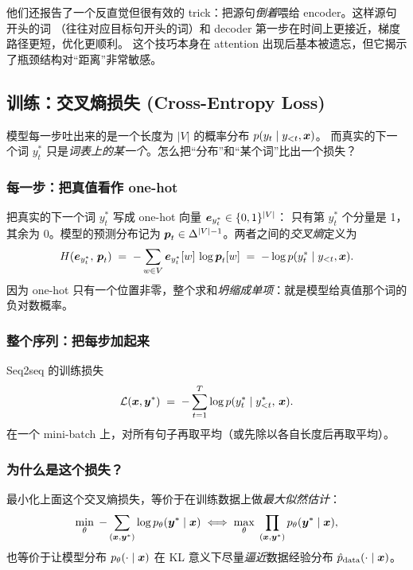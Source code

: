 \begin{remark}[反转源句的小技巧]
他们还报告了一个反直觉但很有效的 trick：把源句\emph{倒着}喂给 encoder。这样源句开头的词
（往往对应目标句开头的词）和 decoder 第一步在时间上更接近，梯度路径更短，优化更顺利。
这个技巧本身在 attention 出现后基本被遗忘，但它揭示了瓶颈结构对“距离”非常敏感。
\end{remark}

\subsection{训练：交叉熵损失 (Cross-Entropy Loss)}
\label{sec:ce-loss}

\begin{problemblock}
模型每一步吐出来的是一个长度为 $|V|$ 的概率分布 $p(y_t \mid y_{<t}, \boldsymbol{x})$。
而真实的下一个词 $y_t^*$ 只是\emph{词表上的某一个}。怎么把“分布”和“某个词”比出一个损失？
\end{problemblock}

\subsubsection{每一步：把真值看作 one-hot}

把真实的下一个词 $y_t^*$ 写成 one-hot 向量 $\boldsymbol{e}_{y_t^*} \in \{0,1\}^{|V|}$：
只有第 $y_t^*$ 个分量是 1，其余为 0。模型的预测分布记为
$\boldsymbol{p}_t \in \Delta^{|V|-1}$。两者之间的\emph{交叉熵}定义为
\[
    H(\boldsymbol{e}_{y_t^*},\, \boldsymbol{p}_t)
    \;=\; -\sum_{w \in V} \boldsymbol{e}_{y_t^*}[w] \,\log \boldsymbol{p}_t[w]
    \;=\; -\log p(y_t^* \mid y_{<t}, \boldsymbol{x}).
\]
因为 one-hot 只有一个位置非零，整个求和\emph{坍缩成单项}：就是模型给真值那个词的负对数概率。

\subsubsection{整个序列：把每步加起来}

\begin{mathbox}{Seq2seq 的训练损失}
\[
    \mathcal{L}(\boldsymbol{x}, \boldsymbol{y}^*)
    \;=\; -\sum_{t=1}^{T} \log p(y_t^* \mid y_{<t}^*,\, \boldsymbol{x}).
\]
在一个 mini-batch 上，对所有句子再取平均（或先除以各自长度后再取平均）。
\end{mathbox}

\subsubsection{为什么是这个损失？}

\begin{theorem}[交叉熵 = 最大似然 = 最小 KL]
最小化上面这个交叉熵损失，等价于在训练数据上做\emph{最大似然估计}：
\[
    \min_{\theta}\; -\sum_{(\boldsymbol{x},\boldsymbol{y}^*)} \log p_\theta(\boldsymbol{y}^* \mid \boldsymbol{x})
    \;\Longleftrightarrow\;
    \max_{\theta}\; \prod_{(\boldsymbol{x},\boldsymbol{y}^*)} p_\theta(\boldsymbol{y}^* \mid \boldsymbol{x}),
\]
也等价于让模型分布 $p_\theta(\cdot \mid \boldsymbol{x})$ 在 KL 意义下尽量\emph{逼近}数据经验分布
$\hat{p}_{\text{data}}(\cdot \mid \boldsymbol{x})$。
\end{theorem}

